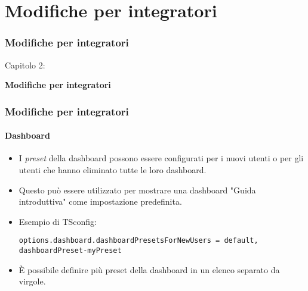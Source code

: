 %

\section{Modifiche per integratori}
\begin{frame}[fragile]
	\frametitle{Modifiche per integratori}

	\begin{center}\huge{Capitolo 2:}\end{center}
	\begin{center}\huge{\color{typo3darkgrey}\textbf{Modifiche per integratori}}\end{center}

\end{frame}


\begin{frame}[fragile]
	\frametitle{Modifiche per integratori}
	\framesubtitle{Dashboard}

	\lstset{basicstyle=\tiny\ttfamily}

	\begin{itemize}
		\item I \textit{preset} della dashboard possono essere configurati per i nuovi utenti o
		    per gli utenti che hanno eliminato tutte le loro dashboard.
		\item Questo può essere utilizzato per mostrare una dashboard "Guida introduttiva" come impostazione predefinita.
		\item Esempio di TSconfig:

\vspace{-0.4cm}
\begin{lstlisting}
options.dashboard.dashboardPresetsForNewUsers = default, dashboardPreset-myPreset
\end{lstlisting}

		\item È possibile definire più preset della dashboard in un elenco separato da virgole.

	\end{itemize}

\end{frame}

